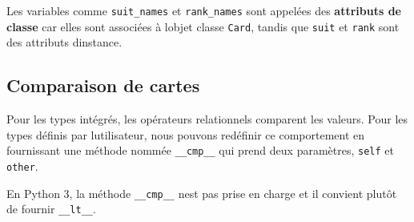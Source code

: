 \begin{Shaded}
\begin{Highlighting}[]

\OperatorTok{=}\NormalTok{ [}\NormalTok{, }\NormalTok{, }\NormalTok{, }\NormalTok{]}
\OperatorTok{=}\NormalTok{ [}
    \NormalTok{,}
    \NormalTok{,}
    \NormalTok{,}
    \NormalTok{,}
    \NormalTok{,}
    \NormalTok{,}
    \NormalTok{,}
    \NormalTok{,}
    \NormalTok{,}
    \NormalTok{,}
    \NormalTok{,}
    \NormalTok{,}
    \NormalTok{,}
    \NormalTok{,}
\NormalTok{]}


 \NormalTok{(}\NormalTok{):}
      \OperatorTok{\%}\NormalTok{ (Card.rank\_names[}\NormalTok{.rank], Card.suit\_names[}\NormalTok{.suit])}
\end{Highlighting}
\end{Shaded}

Les variables comme \texttt{suit\_names} et \texttt{rank\_names} sont
appelées des \textbf{attributs de classe} car elles sont associées à
l\textquotesingle objet classe \texttt{Card}, tandis que \texttt{suit}
et \texttt{rank} sont des attributs d\textquotesingle instance.

\hypertarget{comparaison-de-cartes}{%
\subsection{Comparaison de cartes}\label{comparaison-de-cartes}}

Pour les types intégrés, les opérateurs relationnels comparent les
valeurs. Pour les types définis par l\textquotesingle utilisateur, nous
pouvons redéfinir ce comportement en fournissant une méthode nommée
\texttt{\_\_cmp\_\_} qui prend deux paramètres, \texttt{self} et
\texttt{other}.

En Python 3, la méthode \texttt{\_\_cmp\_\_} n\textquotesingle est pas
prise en charge et il convient plutôt de fournir \texttt{\_\_lt\_\_}.

